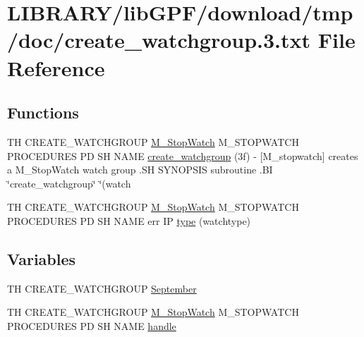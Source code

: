 \hypertarget{create__watchgroup_83_8txt}{}\section{L\+I\+B\+R\+A\+R\+Y/lib\+G\+P\+F/download/tmp/doc/create\+\_\+watchgroup.3.txt File Reference}
\label{create__watchgroup_83_8txt}
\subsection*{Functions}
\begin{DoxyCompactItemize}
\item 
TH C\+R\+E\+A\+T\+E\+\_\+\+W\+A\+T\+C\+H\+G\+R\+O\+UP \hyperlink{option__stopwatch_83_8txt_aa2011fc45a5e502e87ee50996a8a9305}{M\+\_\+\+Stop\+Watch} M\+\_\+\+S\+T\+O\+P\+W\+A\+T\+CH P\+R\+O\+C\+E\+D\+U\+R\+ES PD SH N\+A\+ME \hyperlink{create__watchgroup_83_8txt_a7e1fab3a0b16096cc31b6750b1a1fa6f}{create\+\_\+watchgroup} (3f) -\/ \mbox{[}\+M\+\_\+stopwatch\mbox{]} creates a M\+\_\+\+Stop\+Watch watch group .\+S\+H S\+Y\+N\+O\+P\+S\+I\+S subroutine .\+B\+I \char`\"{}create\+\_\+watchgroup\char`\"{} \char`\"{}(watch
\item 
TH C\+R\+E\+A\+T\+E\+\_\+\+W\+A\+T\+C\+H\+G\+R\+O\+UP \hyperlink{option__stopwatch_83_8txt_aa2011fc45a5e502e87ee50996a8a9305}{M\+\_\+\+Stop\+Watch} M\+\_\+\+S\+T\+O\+P\+W\+A\+T\+CH P\+R\+O\+C\+E\+D\+U\+R\+ES PD SH N\+A\+ME err IP \hyperlink{create__watchgroup_83_8txt_adc4024c3b4c8e8b4c2f17a2937352e5d}{type} (watchtype)
\end{DoxyCompactItemize}
\subsection*{Variables}
\begin{DoxyCompactItemize}
\item 
TH C\+R\+E\+A\+T\+E\+\_\+\+W\+A\+T\+C\+H\+G\+R\+O\+UP \hyperlink{create__watchgroup_83_8txt_a2fe56ee2e395403bb06376136f40e45c}{September}
\item 
TH C\+R\+E\+A\+T\+E\+\_\+\+W\+A\+T\+C\+H\+G\+R\+O\+UP \hyperlink{option__stopwatch_83_8txt_aa2011fc45a5e502e87ee50996a8a9305}{M\+\_\+\+Stop\+Watch} M\+\_\+\+S\+T\+O\+P\+W\+A\+T\+CH P\+R\+O\+C\+E\+D\+U\+R\+ES PD SH N\+A\+ME \hyperlink{create__watchgroup_83_8txt_a5f82c33d958a5267f1648fdea2152853}{handle}
\end{DoxyCompactItemize}


